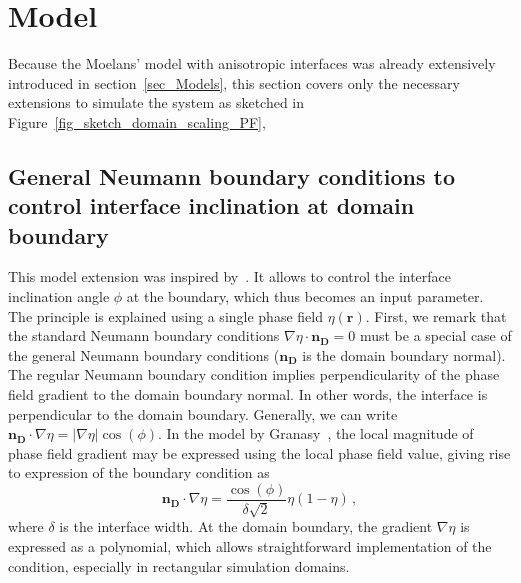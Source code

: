 \section{Model}
Because the Moelans' model with anisotropic interfaces was already extensively introduced in section~\ref{sec_Models}, this section covers only the necessary extensions to simulate the system as sketched in Figure~\ref{fig_sketch_domain_scaling_PF}, 

	\subsection{General Neumann boundary conditions to control interface inclination at domain boundary}\label{sec_general_NBC_ch_NPA_PF}
	This model extension was inspired by~\cite{Granasy2007}. It allows to control the interface inclination angle $\phi$ at the boundary, which thus becomes an input parameter. The principle is explained using a single phase field $\eta(\bm{r})$. 
	First, we remark that the standard Neumann boundary conditions $\nabla\eta\cdot\bm{n_D}=0$ must be a special case of the general Neumann boundary conditions ($\bm{n_D}$ is the domain boundary normal). The regular Neumann boundary condition implies perpendicularity of the phase field gradient to the domain boundary normal. In other words, the interface is perpendicular to the domain boundary. Generally, we can write $\bm{n_D}\cdot \nabla\eta=|\nabla\eta|\cos(\phi)$. In the model by Granasy~\cite{Granasy2007}, the local magnitude of phase field gradient may be expressed using the local phase field value, giving rise to expression of the boundary condition as
	\begin{equation}
		\bm{n_D}\cdot \nabla\eta=\frac{\cos(\phi)}{\delta\sqrt{2}}\eta(1-\eta)\,,
	\end{equation}
	where $\delta$ is the interface width. At the domain boundary, the gradient $\nabla\eta$ is expressed as a polynomial, which allows straightforward implementation of the condition, especially in rectangular simulation domains.\\
	
